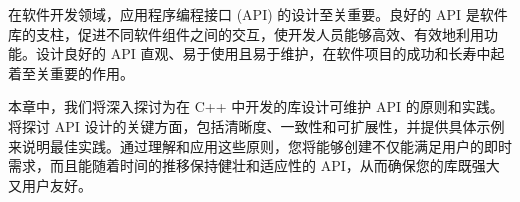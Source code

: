 在软件开发领域，应用程序编程接口 (API) 的设计至关重要。良好的 API 是软件库的支柱，促进不同软件组件之间的交互，使开发人员能够高效、有效地利用功能。设计良好的 API 直观、易于使用且易于维护，在软件项目的成功和长寿中起着至关重要的作用。

本章中，我们将深入探讨为在 C++ 中开发的库设计可维护 API 的原则和实践。将探讨 API 设计的关键方面，包括清晰度、一致性和可扩展性，并提供具体示例来说明最佳实践。通过理解和应用这些原则，您将能够创建不仅能满足用户的即时需求，而且能随着时间的推移保持健壮和适应性的 API，从而确保您的库既强大又用户友好。
